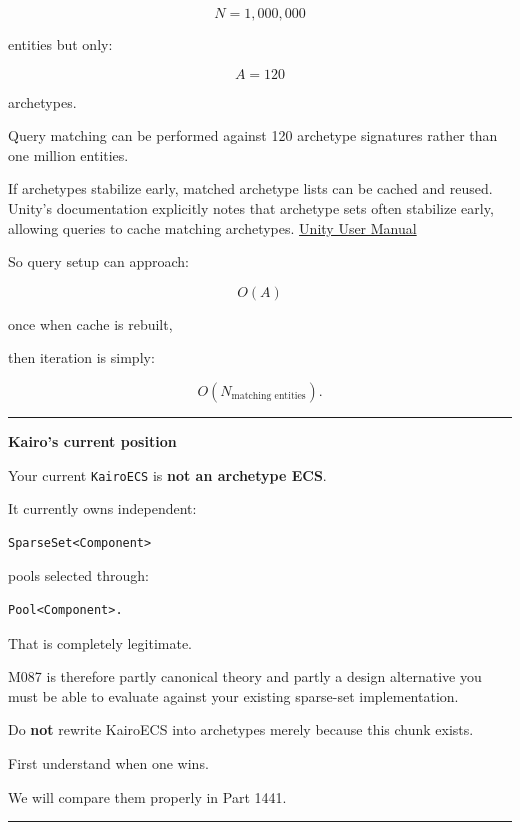 \[
N=1,000,000
\]

entities but only:

\[
A=120
\]

archetypes.

Query matching can be performed against 120 archetype signatures rather than one million entities.

If archetypes stabilize early, matched archetype lists can be cached and reused. Unity's documentation explicitly notes that archetype sets often stabilize early, allowing queries to cache matching archetypes. \href{https://docs.unity.cn/Packages/com.unity.entities\%401.0/manual/concepts-archetypes.html?utm_source=chatgpt.com}{Unity User Manual}

So query setup can approach:

\[
O(A)
\]

once when cache is rebuilt,

then iteration is simply:

\[
O(N_{\text{matching entities}}).
\]

\begin{center}\rule{0.5\linewidth}{0.5pt}\end{center}

\textbf{Kairo's current position}

Your current \texttt{KairoECS} is \textbf{not an archetype ECS}.

It currently owns independent:

\begin{verbatim}
SparseSet<Component>
\end{verbatim}

pools selected through:

\begin{verbatim}
Pool<Component>.
\end{verbatim}

That is completely legitimate.

M087 is therefore partly canonical theory and partly a design alternative you must be able to evaluate against your existing sparse-set implementation.

Do \textbf{not} rewrite KairoECS into archetypes merely because this chunk exists.

First understand when one wins.

We will compare them properly in Part 1441.

\begin{center}\rule{0.5\linewidth}{0.5pt}\end{center}

